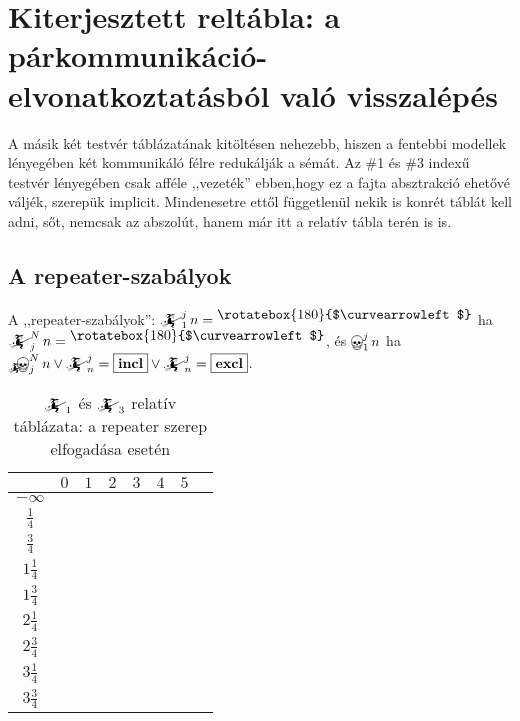\documentclass{article}
\newcommand{\blk}{\cellcolor{darkgray}}
\newcommand{\red}{\cellcolor{red!33}}
\newcommand{\grn}{\cellcolor{green!33}}
\newcommand{\nothing}{\text{\raisebox{0.4em}{\rotatebox{180}{$\curvearrowleft$}}}}%
\newcommand{\just}[1]{\boxed{#1}}%
\newcommand{\incl}{\mathbf{incl}}
\newcommand{\excl}{\mathbf{excl}}
\newcommand{\mainfun}[3]{\mathwitch_{#1}^{#2}#3}
\newcommand{\nomainfun}[3]{\bigskull_{#1}^{#2}#3}
\newcommand{\currymainfun}[1]{\mathwitch_{#1}}
\newcommand{\mainfunA}[3]{\mathwitch_{#2}^{#1}#3}
\newcommand{\nomainfunA}[3]{{}_{\mathwitch}\!\!\!\!\bigskull^{#1}_{#2}#3}
\begin{document}
	\section{Kiterjesztett reltábla: a párkommunikáció-elvonatkoztatásból való visszalépés}

	A másik két testvér táblázatának kitöltésen nehezebb, hiszen a fentebbi modellek lényegében két kommunikáló félre redukálják a sémát.
	Az \#1 és \#3 indexű testvér lényegében csak afféle ,,vezeték'' ebben,hogy ez a fajta absztrakció ehetővé váljék, szerepük implicit.
	Mindenesetre ettől függetlenül nekik is konrét táblát kell adni, sőt, nemcsak az abszolút, hanem már itt a relatív tábla terén is is.

	\subsection{A repeater-szabályok}

	A ,,repeater-szabályok'': $\mainfun1jn = \nothing$ ha $\mainfunA Njn = \nothing$, és $\nomainfun1jn$ ha $\nomainfunA Njn \lor \mainfunA jn = \just\incl \lor \mainfunA jn = \just\excl$.

	\begin{table}[H]
		\caption*{$\currymainfun1$ és $\currymainfun3$ relatív táblázata: a repeater szerep elfogadása esetén}
		\centering
		\begin{tabular}{c||c|c|c|c|c|c|c|}
				&	$0$		&	$1$		&	$2$		&	$3$		&	$4$		&	$5$		\\\hline\hline
		$-\infty$	&	\nothing	&	\nothing	&	\nothing	&	\nothing	&	\nothing	&	\nothing	\\\hline
		$\frac14$	&	\nothing	&	\nothing	&	\nothing	&	\nothing	&	\nothing	&	\grn\just\incl	\\\hline
		$\frac34$	&	\red\just\excl	&	\nothing	&	\nothing	&	\nothing	&	\nothing	&	\grn\just\incl	\\\hline
		$1\frac14$	&	\red\just\excl	&	\nothing	&	\nothing	&	\nothing	&	\grn\just\incl	&	\blk		\\\hline
		$1\frac34$	&	\blk		&	\red\just\excl	&	\nothing	&	\nothing	&	\grn\just\incl	&	\blk		\\\hline
		$2\frac14$	&	\blk		&	\red\just\excl	&	\nothing	&	\grn\just\incl	&	\blk		&	\blk		\\\hline
		$2\frac34$	&	\blk		&	\blk		&	\red\just\excl	&	\grn\just\incl	&	\blk		&	\blk		\\\hline
		$3\frac14$	&	\blk		&	\blk		&	\blk		&	\blk		&	\blk		&	\blk		\\\hline
		$3\frac34$	&	\blk		&	\blk		&	\blk		&	\blk		&	\blk		&	\blk		\\\hline
		\end{tabular}
	\end{table}
\end{document}
